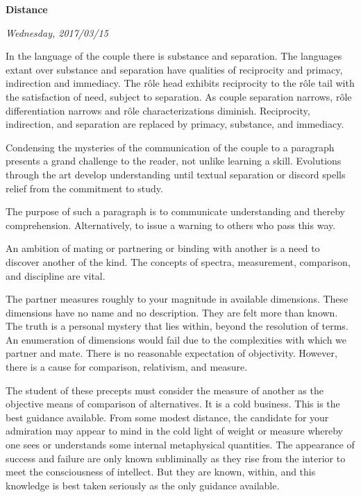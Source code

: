 

\centerline{\bf Distance}
\centerline{\it Wednesday, 2017/03/15}



\vfill
\break

﻿In the language of the couple there is substance and separation.  The
languages extant over substance and separation have qualities of
reciprocity and primacy, indirection and immediacy.  The r\^{o}le head
exhibits reciprocity to the r\^{o}le tail with the satisfaction of
need, subject to separation.  As couple separation narrows, r\^{o}le
differentiation narrows and r\^{o}le characterizations diminish.
Reciprocity, indirection, and separation are replaced by primacy,
substance, and immediacy.

Condensing the mysteries of the communication of the couple to a
paragraph presents a grand challenge to the reader, not unlike
learning a skill.  Evolutions through the art develop understanding
until textual separation or discord spells relief from the commitment
to study.

The purpose of such a paragraph is to communicate understanding and
thereby comprehension.  Alternatively, to issue a warning to others
who pass this way.

\vfill
\break

﻿An ambition of mating or partnering or binding with another is a need
to discover another of the kind.  The concepts of spectra,
measurement, comparison, and discipline are vital.

The partner measures roughly to your magnitude in available
dimensions.  These dimensions have no name and no description.  They
are felt more than known.  The truth is a personal mystery that lies
within, beyond the resolution of terms.  An enumeration of dimensions
would fail due to the complexities with which we partner and mate.
There is no reasonable expectation of objectivity.  However, there is
a cause for comparison, relativism, and measure.

The student of these precepts must consider the measure of another as
the objective means of comparison of alternatives.  It is a cold
business.  This is the best guidance available.  From some modest
distance, the candidate for your admiration may appear to mind in the
cold light of weight or measure whereby one sees or understands some
internal metaphysical quantities.  The appearance of success and
failure are only known subliminally as they rise from the interior to
meet the consciousness of intellect.  But they are known, within, and
this knowledge is best taken seriously as the only guidance available.

